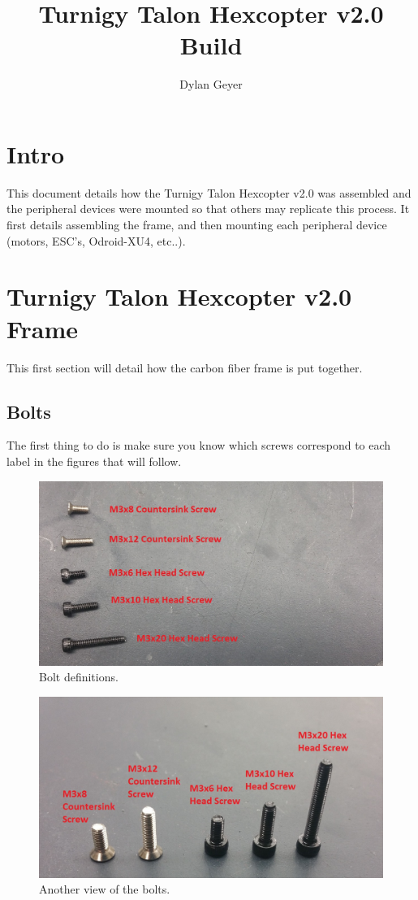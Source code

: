 \documentclass[10pt,notitlepage]{article}
\author{Dylan Geyer}
\title{Turnigy Talon Hexcopter v2.0 Build}
\begin{document}
\maketitle
\section{Intro}
This document details how the Turnigy Talon Hexcopter v2.0 was assembled and the peripheral devices were mounted so that others may replicate this process. It first details assembling the frame, and then mounting each peripheral device (motors, ESC's, Odroid-XU4, etc..).

\section{Turnigy Talon Hexcopter v2.0 Frame}
This first section will detail how the carbon fiber frame is put together.

\subsection{Bolts}
The first thing to do is make sure you know which screws correspond to each label in the figures that will follow. 

\begin{figure}[H]
	\centering
	\includegraphics[width=\textwidth]{Images/Bolts2.jpg}
	\caption{Bolt definitions.}
\end{figure}

\begin{figure}[H]
	\centering
	\includegraphics[width=\textwidth]{Images/Bolts1.jpg}
	\caption{Another view of the bolts.}
\end{figure}
\end{document}
